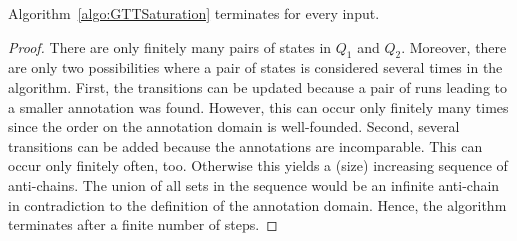 \documentclass{LMCS}
\begin{document}
\begin{rem}
	Algorithm~\ref{algo:GTTSaturation} terminates for every input.
\end{rem}
\begin{proof}
	There are only finitely many pairs of states in $Q_1$ and $Q_2$.
Moreover, there are only two possibilities where a pair of states is considered
several times in the algorithm. First, the transitions can be updated because a pair of runs
leading to a smaller annotation was found. However, this can occur only finitely
many times since the order on the annotation domain is well-founded. Second,
several transitions can be added because the annotations are incomparable. This
can occur only finitely often, too. Otherwise this yields a (size)
increasing sequence of anti-chains. The union of all sets in the sequence would
be an infinite anti-chain in contradiction to the definition of the annotation
domain. Hence, the algorithm terminates after a finite number of steps.
\end{proof}
\end{document}
